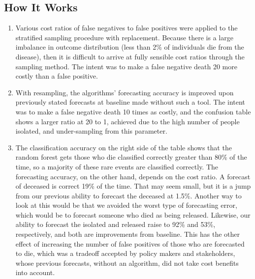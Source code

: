 \documentclass[
]{article}
\begin{document}
\begin{col-sm-6}

\hypertarget{how-it-works}{%
\subsection{How It Works}\label{how-it-works}}

\begin{enumerate}
\def\labelenumi{\arabic{enumi}.}
\item
  Various cost ratios of false negatives to false positives were applied
  to the stratified sampling procedure with replacement. Because there
  is a large imbalance in outcome distribution (less than 2\% of
  individuals die from the disease), then it is difficult to arrive at
  fully sensible cost ratios through the sampling method. The intent was
  to make a false negative death 20 more costly than a false positive.
\item
  With resampling, the algorithms' forecasting accuracy is improved upon
  previously stated forecasts at baseline made without such a tool. The
  intent was to make a false negative death 10 times as costly, and the
  confusion table shows a larger ratio at 20 to 1, achieved due to the
  high number of people isolated, and under-sampling from this
  parameter.
\item
  The classification accuracy on the right side of the table shows that
  the random forest gets those who die classified correctly greater than
  80\% of the time, so a majority of these rare events are classified
  correctly. The forecasting accuracy, on the other hand, depends on the
  cost ratio. A forecast of deceased is correct 19\% of the time. That
  may seem small, but it is a jump from our previous ability to forecast
  the deceased at 1.5\%. Another way to look at this would be that we
  avoided the worst type of forecasting error, which would be to
  forecast someone who died as being released. Likewise, our ability to
  forecast the isolated and released raise to 92\% and 53\%,
  respectively, and both are improvements from baseline. This has the
  other effect of increasing the number of false positives of those who
  are forecasted to die, which was a tradeoff accepted by policy makers
  and stakeholders, whose previous forecasts, without an algorithm, did
  not take cost benefits into account.
\end{enumerate}

\end{col-sm-6}
\end{document}
